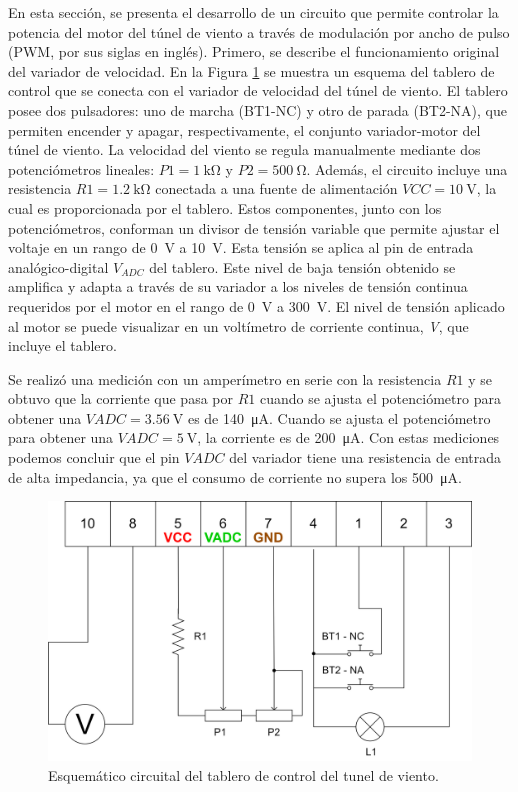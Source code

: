 En esta sección, se presenta el desarrollo de un circuito que permite controlar la potencia del motor del túnel de viento a través de modulación por ancho de pulso (PWM, por sus siglas en inglés). Primero, se describe el funcionamiento original del variador de velocidad. En la Figura \ref{fig:esquemCircuitoControlTunel} se muestra un esquema del tablero de control que se conecta con el variador de velocidad del túnel de viento. El tablero posee dos pulsadores: uno de marcha (BT1-NC) y otro de parada (BT2-NA), que permiten encender y apagar, respectivamente, el conjunto variador-motor del túnel de viento. La velocidad del viento se regula manualmente mediante dos potenciómetros lineales: $P1 = \SI{1}{\kilo\ohm}$ y $P2 = \SI{500}{\ohm}$. Además, el circuito incluye una resistencia $R1 = \SI{1.2}{\kilo\ohm}$ conectada a una fuente de alimentación $VCC = \SI{10}{\volt}$, la cual es proporcionada por el tablero. Estos componentes, junto con los potenciómetros, conforman un divisor de tensión variable que permite ajustar el voltaje en un rango de \SI{0}{\volt} a \SI{10}{\volt}. Esta tensión se aplica al pin de entrada analógico-digital $V_{ADC}$ del tablero. Este nivel de baja tensión obtenido se amplifica y adapta a través de su variador a los niveles de tensión continua requeridos por el motor en el rango de \SI{0}{\volt} a \SI{300}{\volt}. El nivel de tensión aplicado al motor se puede visualizar en un voltímetro de corriente continua, \textit{V}, que incluye el tablero.

Se realizó una medición con un amperímetro en serie con la resistencia $R1$ y se obtuvo que la corriente que pasa por $R1$ cuando se ajusta el potenciómetro para obtener una $VADC = \SI{3.56}{\volt}$ es de \SI{140}{\micro\ampere}. Cuando se ajusta el potenciómetro para obtener una $VADC = \SI{5}{\volt}$, la corriente es de \SI{200}{\micro\ampere}. Con estas mediciones podemos concluir que el pin $VADC$ del variador tiene una resistencia de entrada de alta impedancia, ya que el consumo de corriente no supera los \SI{500}{\micro\ampere}.


\begin{figure}[H]
    \centering
    \includegraphics[width=0.85\linewidth]{Figuras/datalogger/Hardware/esquemCircuitoControlTunel.png}
    \caption{Esquemático circuital del tablero de control del tunel de viento.}
    \label{fig:esquemCircuitoControlTunel}
\end{figure}

